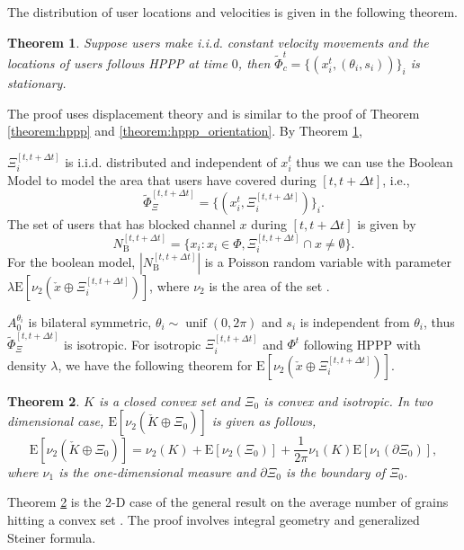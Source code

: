 \documentclass[10pt, conference, letterpaper]{IEEEtran}
\newtheorem{theorem}{Theorem}
\DeclareMathOperator*{\unif}{unif}
\begin{document}
The distribution of user locations and velocities is given in the following theorem.
\begin{theorem}\label{theorem:boolean_stationary}
Suppose users make i.i.d. constant velocity movements and the locations of users follows HPPP at time $0$, then $\tilde{\Phi}_c^t = \{(x_i^t, (\theta_i, s_i))\}_i$ is stationary.
\end{theorem}
The proof uses displacement theory and is similar to the proof of Theorem \ref{theorem:hppp} and \ref{theorem:hppp_orientation}.
By Theorem \ref{theorem:boolean_stationary}, 

$\Xi_i^{[t, t+\Delta t]}$ is i.i.d. distributed and independent of $x_i^t$ thus we can use the Boolean Model \cite{stochasticgeometry} to model the area that users have covered during $[t, t+\Delta t]$, i.e., 
\begin{equation*}
\tilde{\Phi}_{\Xi}^{[t, t+\Delta t]} = \{(x_i^t, \Xi_i^{[t, t+\Delta t]})\}_i.
\end{equation*}
The set of users that has blocked channel $x$ during $[t, t+\Delta t]$ is given by
\begin{equation*}
N_{\mathrm{B}}^{[t, t + \Delta t]} = \{x_i:x_i \in \Phi, \Xi_i^{[t, t+\Delta t]}\cap x \neq \emptyset \}.
\end{equation*}
For the boolean model, $|N_{\mathrm{B}}^{[t, t + \Delta t]}|$ is a Poisson random variable with parameter $\lambda\mathrm{E}[\nu_2(\check{x}\oplus \Xi_i^{[t, t+\Delta t]})]$, where $\nu_2$ is the area of the set \cite{stochasticgeometry}.

$A_0^{\theta_i}$ is bilateral symmetric, $\theta_i\sim\unif(0, 2\pi)$ and $s_i$ is independent from $\theta_i$, thus $\tilde{\Phi}_{\Xi}^{[t, t+\Delta t]}$ is isotropic. For isotropic $\Xi_i^{[t, t+\Delta t]}$ and $\Phi^t$ following HPPP with density $\lambda$, we have the following theorem for $\mathrm{E}[\nu_2(\check{x}\oplus\Xi_i^{[t, t+\Delta t]})]$.

\begin{theorem}\label{theorem:boolean_mean}
$K$ is a closed convex set and $\Xi_0$ is convex and isotropic. In two dimensional case, $\mathrm{E}[\nu_2(\check{K}\oplus \Xi_0)]$ is given as follows,
\begin{equation}
\mathrm{E}[\nu_2(\check{K}\oplus \Xi_0)] = \nu_2(K) + \mathrm{E}[\nu_2(\Xi_0)] + \frac{1}{2\pi}\nu_1(K)\mathrm{E}[\nu_1(\partial \Xi_0)],
\end{equation}
where $\nu_1$ is the one-dimensional measure and $\partial \Xi_0$ is the boundary of $\Xi_0$.
\end{theorem}
Theorem \ref{theorem:boolean_mean} is the 2-D case of the general result on the average number of grains hitting a convex set \cite{}. The proof involves integral geometry and generalized Steiner formula.
\end{document}
